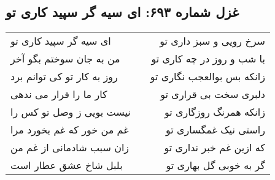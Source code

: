 \begin{center}
\section*{غزل شماره ۶۹۳: ای سیه گر سپید کاری تو}
\label{sec:693}
\begin{longtable}{l p{0.5cm} r}
ای سیه گر سپید کاری تو
&&
سرخ رویی و سبز داری تو
\\
من به جان سوختم بگو آخر
&&
با شب و روز در چه کاری تو
\\
روز به کار تو کی توانم برد
&&
زانکه بس بوالعجب نگاری تو
\\
کار ما را قرار می ندهی
&&
دلبری سخت بی قراری تو
\\
نیست بویی ز وصل تو کس را
&&
زانکه همرنگ روزگاری تو
\\
غم من خور که غم بخورد مرا
&&
راستی نیک غمگساری تو
\\
زان سبب شادمانی از غم من
&&
که ازین غم خبر نداری تو
\\
بلبل شاخ عشق عطار است
&&
گر به خوبی گل بهاری تو
\\
\end{longtable}
\end{center}
